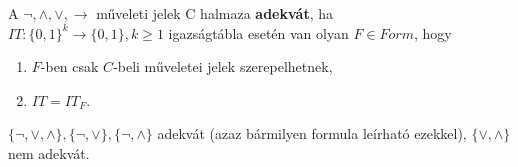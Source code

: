 \begin{frame}

\begin{tcolorbox}[title={Def: Adekvát halmaz}]
A ${\neg}, {\land}, {\lor}, \rightarrow$ műveleti jelek C halmaza \textbf{adekvát}, ha\\
$IT: \{0, 1\}^k \rightarrow \{0, 1\}, k \geq 1$ igazságtábla esetén van olyan $F \in Form$, hogy\\
\begin{enumerate}
\item $F$-ben csak $C$-beli műveletei jelek szerepelhetnek,
\item $IT = IT_F$.
\end{enumerate} 
\end{tcolorbox}
\mbigskip

\begin{tcolorbox}[title={Tétel: Adekvát halmazok}]
$\{\neg, \lor, \land\}, \{\neg, \lor\}, \{\neg, \land\}$ adekvát (azaz bármilyen formula leírható ezekkel), $\{\lor, \land\}$ nem adekvát.
\end{tcolorbox}

\end{frame}

